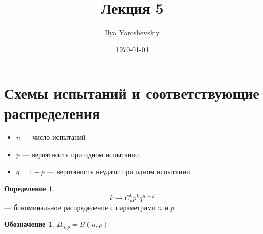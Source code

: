 \documentclass[english]{article}
\author{Ilya Yaroshevskiy}
\date{\today}
\title{Лекция 5}
\theoremstyle{plain}
\theoremstyle{remark}
\theoremstyle{definition}
\newtheorem*{definition}{Определение}
\newtheorem*{symb}{Обозначение}
\begin{document}
\maketitle
\tableofcontents


\section{Схемы испытаний и соответствующие распределения}
\label{sec:org34cb085}
\begin{itemize}
\item \(n\) --- число испытаний
\item \(p\) --- вероятность при одном испытании
\item \(q = 1 - p\) --- веротяность неудачи при одном испытании
\end{itemize}


\begin{definition}
\[ k \to C^k_n p^k q^{n - k} \] --- биноминальное распределение с параметрами \(n\) и \(p\)
\end{definition}
\begin{symb}
\(B_{n,p} = B(n, p)\)
\end{symb}
\end{document}

